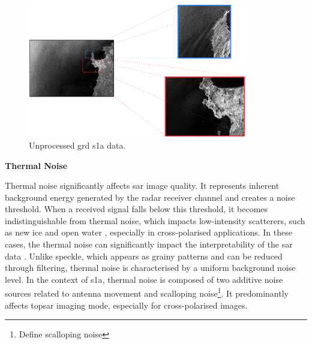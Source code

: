 \begin{figure}[H]
    \centering
    \includegraphics[width=0.85\textwidth]{Figures/Theory/unprocessedSARData.pdf}
    \caption{Unprocessed \acs{grd} \acs{s1a} data.}
    \label{fig:theory.data.unprocessed}
\end{figure}

\textbf{Thermal Noise}

Thermal noise significantly affects \acs{sar} image quality. It represents inherent background energy generated by the radar receiver channel and creates a noise threshold. When a received signal falls below this threshold, it becomes indistinguishable from thermal noise, which impacts low-intensity scatterers, such as new ice and open water \cite{Carsey1992}, especially in cross-polarised applications. In these cases, the thermal noise can significantly impact the interpretability of the \acs{sar} data \cite{Carsey1992}. Unlike speckle, which appears as grainy patterns and can be reduced through filtering, thermal noise is characterised by a uniform background noise level. In the context of \acs{s1a}, thermal noise is composed of two additive noise sources related to antenna movement and scalloping noise\footnote{Define scalloping noise}. It predominantly affects \acs{topsar} imaging mode, especially for cross-polarised images.


